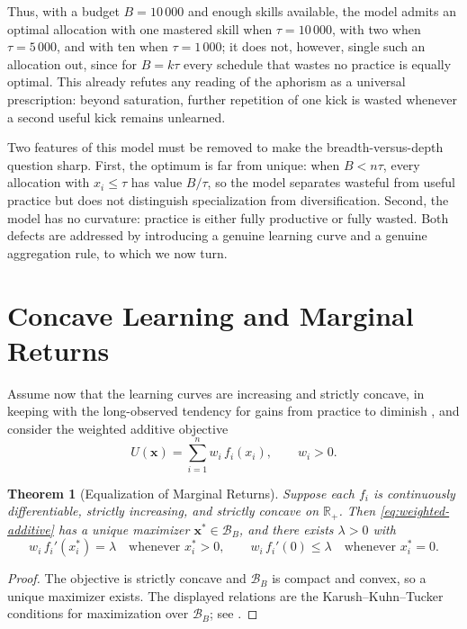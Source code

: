 \documentclass[11pt]{article}
\newtheorem{theorem}{Theorem}[section]
\theoremstyle{definition}
\theoremstyle{remark}
\newcommand{\Rplus}{\mathbb{R}_{+}}
\newcommand{\vx}{\mathbf{x}}
\newcommand{\simplex}{\mathcal{B}}
\begin{document}
Thus, with a budget \(B=10\,000\) and enough skills available, the
model admits an optimal allocation with one mastered skill when
\(\tau=10\,000\), with two when \(\tau=5\,000\), and with ten when
\(\tau=1\,000\); it does not, however, single such an allocation out,
since for \(B=k\tau\) every schedule that wastes no practice is
equally optimal.  This already refutes any reading of the aphorism as
a universal prescription: beyond saturation, further repetition of one
kick is wasted whenever a second useful kick remains unlearned.

Two features of this model must be removed to make the
breadth-versus-depth question sharp.  First, the optimum is far from
unique: when \(B<n\tau\), every allocation with \(x_i\leq\tau\) has
value \(B/\tau\), so the model separates wasteful from useful practice
but does not distinguish specialization from diversification.  Second,
the model has no curvature: practice is either fully productive or
fully wasted.  Both defects are addressed by introducing a genuine
learning curve and a genuine aggregation rule, to which we now turn.


\section{Concave Learning and Marginal Returns}
\label{sec:additive}

Assume now that the learning curves are increasing and strictly
concave, in keeping with the long-observed tendency for gains from
practice to diminish \citep{newell1981practice}, and consider the
weighted additive objective
\begin{equation}
    U(\vx)
    =
    \sum_{i=1}^n w_i\,f_i(x_i),
    \qquad w_i>0.
    \label{eq:weighted-additive}
\end{equation}

\begin{theorem}[Equalization of Marginal Returns]
\label{thm:marginal-equalization}
Suppose each \(f_i\) is continuously differentiable, strictly
increasing, and strictly concave on \(\Rplus\).  Then
\eqref{eq:weighted-additive} has a unique maximizer
\(\vx^*\in\simplex_B\), and there exists \(\lambda>0\) with
\[
    w_i\,f_i'(x_i^*)=\lambda
    \quad\text{whenever } x_i^*>0,
    \qquad
    w_i\,f_i'(0)\leq\lambda
    \quad\text{whenever } x_i^*=0.
\]
\end{theorem}

\begin{proof}
The objective is strictly concave and \(\simplex_B\) is compact and
convex, so a unique maximizer exists. The displayed relations are the
Karush--Kuhn--Tucker conditions for maximization over \(\simplex_B\);
see \citet[Ch.~5]{boyd2004convex}.
\end{proof}
\end{document}
